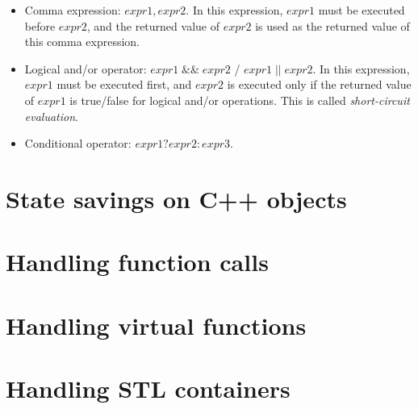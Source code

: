 \documentclass[12pt]{gatech-thesis}
\begin{document}
\begin{itemize}

\item Comma expression: $expr1, expr2$. 
In this expression, $expr1$ must be executed before $expr2$, and the returned value of $expr2$ is used as the returned value of this comma expression.

\item Logical and/or operator: $expr1 \;\&\&\; expr2$ / $expr1\; ||\; expr2$. 
In this expression, $expr1$ must be executed first, and $expr2$ is  executed only if the returned value of $expr1$ is true/false for logical and/or operations.
This is called \emph{short-circuit evaluation}.

\item Conditional operator: $expr1 ? expr2 : expr3$.


\end{itemize}


\section{State savings on C++ objects}

\section{Handling function calls}

\section{Handling virtual functions}

\section{Handling STL containers}




\end{document}
